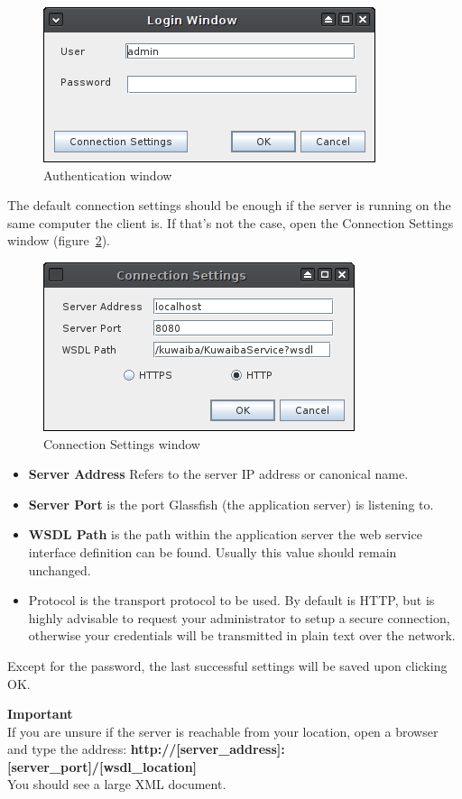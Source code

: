 \documentclass[a4paper]{article}
\begin{document}
	\begin{figure}[h!]
		\centering
		\includegraphics[width=0.5\linewidth]{img/auth_window.png}
		\caption{Authentication window}
		\label{fig:auth_window}
	\end{figure}
	The default connection settings should be enough if the server is running on the same computer the client is. If that's not the case, open the Connection Settings window (figure~\ref{fig:connection_settings}).
	\begin{figure}[h!]
		\centering
		\includegraphics[width=0.5\linewidth]{img/connection_settings.png}
		\caption{Connection Settings window}
		\label{fig:connection_settings}
	\end{figure}
	\begin{itemize}
		\item \textbf{Server Address} Refers to the server IP address or canonical name.
		\item \textbf{Server Port} is the port Glassfish (the application server) is listening to.
		\item \textbf{WSDL Path} is the path within the application server the web service interface definition can be found. Usually this value should remain unchanged.
		\item Protocol is the transport protocol to be used. By default is HTTP, but is highly advisable to request your administrator to setup a secure connection, otherwise your credentials will be transmitted in plain text over the network. 
	\end{itemize}
	Except for the password, the last successful settings will be saved upon clicking OK.
	\begin{framed} {\large \textbf{Important}} \\
		If you are unsure if the server is reachable from your location, open a browser and type the address: \textbf{http://[server\_address]:[server\_port]/[wsdl\_location]}\\
		
		You should see a large XML document.
	\end{framed}
\end{document}

